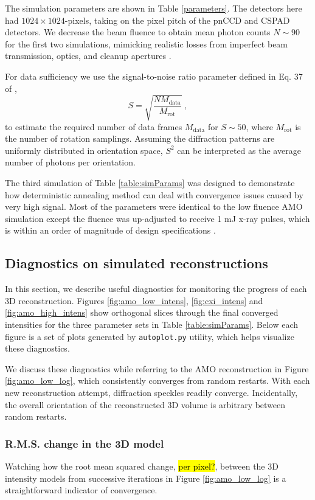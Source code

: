 \documentclass[preprint]{iucr}              %
\begin{document}
The simulation parameters are shown in Table \ref{parameters}. The detectors here had $1024\times1024$-pixels, taking on the pixel pitch of the pnCCD\cite{Struder2010} and CSPAD\cite{hart2012} detectors. We decrease the beam fluence to obtain mean photon counts $N\sim 90$ for the first two simulations, mimicking realistic losses from imperfect beam transmission, optics, and cleanup apertures \cite{Loh2013}. 

For data sufficiency we use the signal-to-noise ratio parameter defined in Eq. 37 of , 
\begin{equation}
S = \sqrt{\frac{N M_{\text{data}}}{M_{\text{rot}}}}\; ,
\end{equation}
to estimate the required number of data frames $M_{\text{data}}$ for $S\sim50$, where $M_{\text{rot}}$ is the number of rotation samplings. Assuming the diffraction patterns are uniformly distributed in orientation space, $S^2$ can be interpreted as the average number of photons per orientation.

The third simulation of Table \ref{table:simParams} was designed to demonstrate how deterministic annealing method can deal with convergence issues caused by very high signal. Most of the parameters were identical to the low fluence AMO simulation except the fluence was up-adjusted to receive 1 mJ x-ray pulses, which is within an order of magnitude of design specifications \cite{Emma2010}.

\subsection{Diagnostics on simulated reconstructions} \label{subsec:recon}
In this section, we describe useful diagnostics for monitoring the progress of each 3D reconstruction. Figures \ref{fig:amo_low_intens}, \ref{fig:cxi_intens} and \ref{fig:amo_high_intens} show orthogonal slices through the final converged intensities for the three parameter sets in Table \ref{table:simParams}. Below each figure is a set of plots generated by \texttt{autoplot.py} utility, which helps visualize these diagnostics. 

We discuss these diagnostics while referring to the AMO reconstruction in Figure \ref{fig:amo_low_log}, which consistently converges from random restarts. With each new reconstruction attempt, diffraction speckles readily converge. Incidentally, the overall orientation of the reconstructed 3D volume is arbitrary between random restarts. 

\subsubsection{R.M.S. change in the 3D model}
Watching how the root mean squared change, \hl{per pixel?}, between the 3D intensity models from successive iterations in Figure \ref{fig:amo_low_log} is a straightforward indicator of convergence. 
\end{document}

